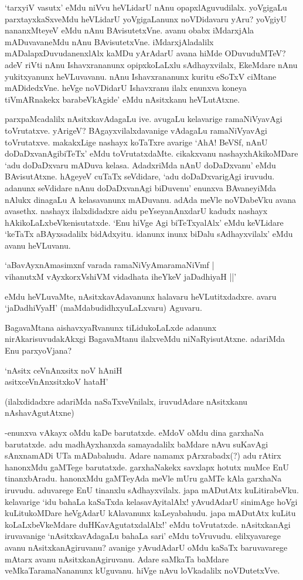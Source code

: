 `tarxyiV vasutx' eMdu niVvu heVLidarU nAnu opapxlAguvudilalx. yoVgigaLu parxtayxkaSxveMdu heVLidarU yoVgigaLanunx noVDidavaru yAru? yoVgiyU nananxMteyeV eMdu nAnu BAvisutetxVne. avanu obabx iMdarxjAla mADuvavaneMdu nAnu BAvisutetxVne. iMdarxjAladalilx mADalapxDuvudanenxlAlx kaMDu yArAdarU avana hiMde ODuvuduMTeV? adeV riVti nAnu Ishavxrananunx opipxkoLaLxlu sAdhayxvilalx, EkeMdare nAnu yukitxyanunx heVLuvavanu. nAnu Ishavxrananunx kuritu eSoTxV ciMtane mADidedxVne. heVge noVDidarU Ishavxranu ilalx enunxva koneya tiVmARnakekx barabeVkAgide' eMdu nAsitxkanu heVLutAtxne.

parxpaMcadalilx nAsitxkavAdagaLu ive. avugaLu kelavarige ramaNiVyavAgi toVrutatxve. yArigeV? BAgayxvilalxdavanige vAdagaLu ramaNiVyavAgi toVrutatxve. makakxLige nashayx koTaTxre avarige `AhA! BeVSf, nAnU doDaDxvanAgibiTeTx' eMdu toVrutatxdaMte. cikakxvanu nashayxhAkikoMDare `adu doDaDxvaru mADuva kelasa. AdadxriMda nAnU doDaDxvanu' eMdu BAvisutAtxne. hAgeyeV cuTaTx seVdidare, `adu doDaDxvarigAgi iruvudu. adanunx seVdidare nAnu doDaDxvanAgi biDuvenu' enunxva BAvaneyiMda nAlukx dinagaLu A kelasavanunx mADuvanu. adAda meVle noVDabeVku avana avasethx. nashayx ilalxdidadxre aidu peYseyanAnxdarU kadudx nashayx hAkikoLaLxbeVkenisutatxde. `Enu hiVge Agi biTeTxyalAlx' eMdu keVLidare `keTaTx aBAyxsadalilx bidAdxyitu. idanunx inunx biDalu sAdhayxvilalx' eMdu avanu heVLuvanu.

\begin{shloka}
`aBavAyxnAmasimxnf varada ramaNiVyAmaramaNiVmf |\\
vihanutxM vAyxkorxVshiVM vidadhata iheYkeV jaDadhiyaH ||'
\end{shloka}

eMdu heVLuvaMte, nAsitxkavAdavanunx halavaru heVLutitxdadxre. avaru `jaDadhiVyaH' (maMdabudidhxyuLaLxvaru) Aguvaru.

BagavaMtana aishavxyaRvanunx tiLidukoLaLxde adanunx nirAkarisuvudakAkxgi BagavaMtanu ilalxveMdu niNaRyisutAtxne. adariMda Enu parxyoVjana?

\begin{shloka}
`nAsitx ceVnAnxsitx noV hAniH\\
asitxceVnAnxsitxkoV hataH'
\end{shloka}

(ilalxdidadxre adariMda naSaTxveVnilalx, iruvudAdare nAsitxkanu nAshavAgutAtxne)

-enunxva vAkayx oMdu kaDe barutatxde. eMdoV oMdu dina garxhaNa barutatxde. adu madhAyxhanxda samayadalilx baMdare nAvu suKavAgi sAnxnamADi UTa mADabahudu. Adare namamx pArxrabadx(?) adu rAtirx hanonxMdu gaMTege barutatxde. garxhaNakekx savxlapx hotutx muMce EnU tinanxbAradu. hanonxMdu gaMTeyAda meVle mUru gaMTe kAla garxhaNa iruvudu. aduvarege EnU tinanxlu sAdhayxvilalx. japa mADutAtx kuLitirabeVku. kelavarige `idu bahaLa kaSaTxda kelasavAyitalAlx! yAvudAdarU sinimAge hoVgi kuLitukoMDare heVgAdarU kAlavanunx kaLeyabahudu. japa mADutAtx kuLitu koLaLxbeVkeMdare duHKavAgutatxdalAlx!' eMdu toVrutatxde. nAsitxkanAgi iruvavanige `nAsitxkavAdagaLu bahaLa sari' eMdu toVruvudu. elilxyavarege avanu nAsitxkanAgiruvanu? avanige yAvudAdarU oMdu kaSaTx baruvavarege mAtarx avanu nAsitxkanAgiruvanu. Adare saMkaTa baMdare veMkaTaramaNananunx kUguvanu. hiVge nAvu loVkadalilx noVDutetxVve.


